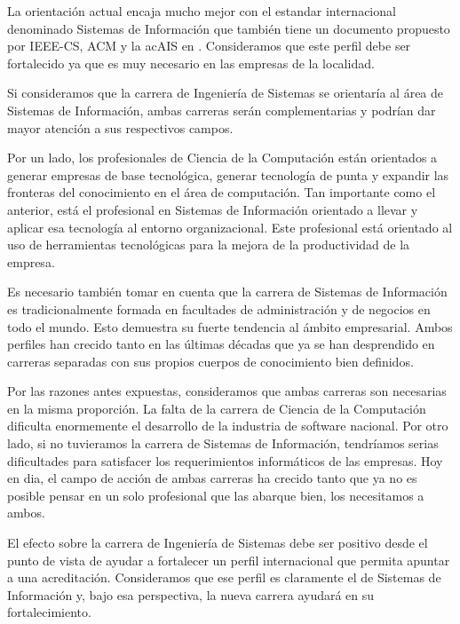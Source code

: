 La orientación actual encaja mucho mejor con el estandar
internacional denominado Sistemas de Información que también tiene
un documento propuesto por IEEE-CS, ACM y la ac{AIS} en
\cite{InformationSystems2002Journal}. Consideramos que este perfil debe ser
fortalecido ya que es muy necesario en las empresas de la localidad.

Si consideramos que la carrera de Ingenierí­a de Sistemas se
orientarí­a al área de Sistemas de Información, ambas carreras serán
complementarias y podrí­an dar mayor atención a sus respectivos
campos.

Por un lado, los profesionales de Ciencia de la Computación están orientados a generar empresas
de base tecnológica, generar tecnologí­a de punta y expandir las
fronteras del conocimiento en el área de computación. Tan importante
como el anterior, está el profesional en Sistemas de Información
orientado a llevar y aplicar esa tecnologí­a al entorno organizacional. Este profesional está orientado al uso de
herramientas tecnológicas para la mejora de la productividad de la empresa.

Es necesario también tomar en cuenta que la carrera de Sistemas de Información es tradicionalmente formada en facultades de administración y de negocios en todo el mundo. Esto demuestra su fuerte tendencia al ámbito empresarial. Ambos perfiles han crecido tanto en las últimas décadas que ya se han desprendido en carreras separadas con sus propios cuerpos de conocimiento bien definidos.

Por las razones antes expuestas, consideramos que ambas carreras son necesarias en la misma proporción. La falta de la carrera de Ciencia de la Computación dificulta enormemente el desarrollo de la industria de software nacional. Por otro lado, si no tuvieramos la carrera de Sistemas de Información, tendrí­amos serias dificultades para satisfacer los requerimientos informáticos de las empresas. Hoy en dia, el campo de acción de ambas carreras ha crecido tanto que ya no es posible pensar en un solo profesional que las abarque bien, los necesitamos a ambos.

El efecto sobre la carrera de Ingenierí­a de Sistemas debe ser positivo desde el punto de vista de ayudar a fortalecer un perfil internacional que permita apuntar a una acreditación. Consideramos que ese perfil es claramente el de Sistemas de Información y, bajo esa perspectiva, la nueva carrera ayudará en su fortalecimiento.